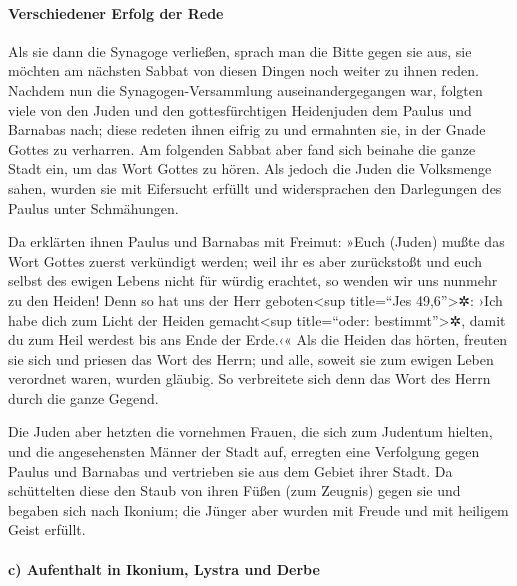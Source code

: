 \hypertarget{verschiedener-erfolg-der-rede}{%
\paragraph{Verschiedener Erfolg der
Rede}\label{verschiedener-erfolg-der-rede}}

 Als sie dann die Synagoge verließen, sprach man die
Bitte gegen sie aus, sie möchten am nächsten Sabbat von diesen Dingen
noch weiter zu ihnen reden.  Nachdem nun die
Synagogen-Versammlung auseinandergegangen war, folgten viele von den
Juden und den gottesfürchtigen Heidenjuden dem Paulus und Barnabas nach;
diese redeten ihnen eifrig zu und ermahnten sie, in der Gnade Gottes zu
verharren.  Am folgenden Sabbat aber fand sich beinahe
die ganze Stadt ein, um das Wort Gottes zu hören.  Als
jedoch die Juden die Volksmenge sahen, wurden sie mit Eifersucht erfüllt
und widersprachen den Darlegungen des Paulus unter Schmähungen.

 Da erklärten ihnen Paulus und Barnabas mit Freimut:
»Euch (Juden) mußte das Wort Gottes zuerst verkündigt werden; weil ihr
es aber zurückstoßt und euch selbst des ewigen Lebens nicht für würdig
erachtet, so wenden wir uns nunmehr zu den Heiden!  Denn
so hat uns der Herr geboten\textless sup title=``Jes
49,6''\textgreater✲: ›Ich habe dich zum Licht der Heiden
gemacht\textless sup title=``oder: bestimmt''\textgreater✲, damit du zum
Heil werdest bis ans Ende der Erde.‹«  Als die Heiden das
hörten, freuten sie sich und priesen das Wort des Herrn; und alle,
soweit sie zum ewigen Leben verordnet waren, wurden gläubig.
 So verbreitete sich denn das Wort des Herrn durch die
ganze Gegend.

 Die Juden aber hetzten die vornehmen Frauen, die sich
zum Judentum hielten, und die angesehensten Männer der Stadt auf,
erregten eine Verfolgung gegen Paulus und Barnabas und vertrieben sie
aus dem Gebiet ihrer Stadt.  Da schüttelten diese den
Staub von ihren Füßen (zum Zeugnis) gegen sie und begaben sich nach
Ikonium;  die Jünger aber wurden mit Freude und mit
heiligem Geist erfüllt.

\hypertarget{c-aufenthalt-in-ikonium-lystra-und-derbe}{%
\paragraph{c) Aufenthalt in Ikonium, Lystra und
Derbe}\label{c-aufenthalt-in-ikonium-lystra-und-derbe}}

